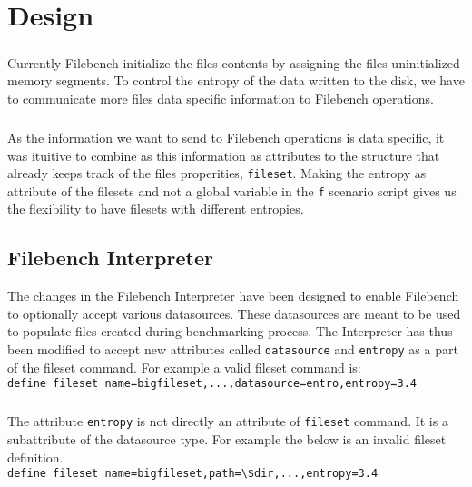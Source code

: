 \chapter{Design}\label{chap:des}

\paragraph{}
Currently Filebench initialize the files contents by assigning the files uninitialized memory segments.
 To control the entropy of the data written to the disk, we have to communicate more files data specific information to Filebench operations.

\paragraph{}
As the information we want to send to Filebench operations is data specific, it was ituitive to combine as this information as attributes to the structure that already keeps track of the files properities, \verb+fileset+.
Making the entropy as attribute of the filesets and not a global variable in the \verb+f+ scenario script gives us the flexibility to have filesets with different entropies.\\

\section{Filebench Interpreter}
The changes in the Filebench Interpreter have been designed to enable Filebench to optionally accept various datasources. These datasources are meant to be used to populate files created during benchmarking process. The Interpreter has thus been modified to accept new attributes called \verb+datasource+ and \verb+entropy+ as a part of the fileset command. For example a valid fileset command is:\\

\indent \verb+define fileset name=bigfileset,...,datasource=entro,entropy=3.4+
\paragraph{}
The attribute \verb+entropy+ is not directly an attribute of \verb+fileset+ command. It is a subattribute of the datasource type. For example the below is an invalid fileset definition.\\

\verb+define fileset name=bigfileset,path=\$dir,...,entropy=3.4+\\
